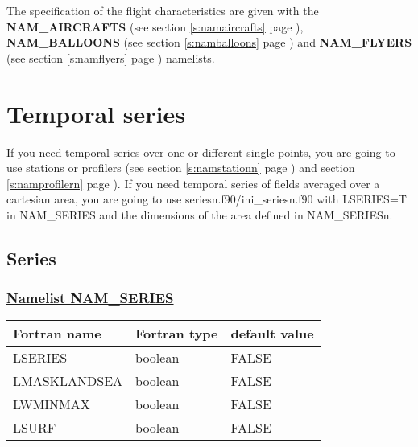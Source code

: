The specification of the flight characteristics are given with the \textbf{NAM\_AIRCRAFTS} (see section \ref{s:namaircrafts} page \pageref{s:namaircrafts}), \textbf{NAM\_BALLOONS} (see section \ref{s:namballoons} page \pageref{s:namballoons}) and \textbf{NAM\_FLYERS} (see section \ref{s:namflyers} page \pageref{s:namflyers}) namelists.

\section{Temporal series}
If you need temporal series over one or different single points, you are going to use stations or profilers (see section \ref{s:namstationn} page \pageref{s:namstationn}) and section \ref{s:namprofilern} page \pageref{s:namprofilern}). If you need temporal series of fields averaged over a cartesian area, you are going to use seriesn.f90/ini\_seriesn.f90 with LSERIES=T in NAM\_SERIES and the dimensions of the area defined in NAM\_SERIESn.

\subsection{Series}
 
\subsubsection{\underline{Namelist NAM\_SERIES}}
\label{ss:series}
\begin{center}
\begin{tabular}{|l|l|l| }
\hline 
 Fortran name & Fortran type  & default value \\
\hline
LSERIES      & boolean & FALSE \\
LMASKLANDSEA & boolean & FALSE \\
LWMINMAX     & boolean & FALSE \\
LSURF        & boolean & FALSE \\
\hline
\end{tabular}
\end{center}


